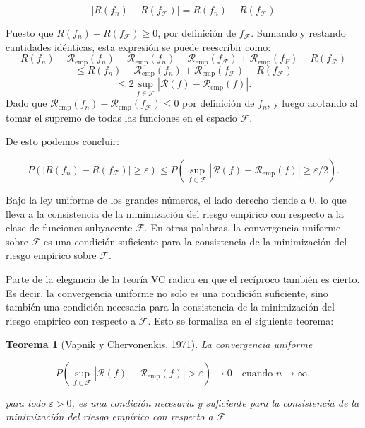\documentclass{report}
\newtheorem{thm}{Teorema}[section]
\begin{document}
\[
|R(f_n) - R(f_\mathcal{F})| = R(f_n) - R(f_\mathcal{F})
\]

Puesto que  \(R(f_n) - R(f_\mathcal{F}) \geq 0\), por definición de \(f_\mathcal{F}\). Sumando y restando cantidades idénticas,
esta expresión se puede reescribir como:
\[
R(f_n) - \mathcal{R}_{\text{emp}}(f_n) + \mathcal{R}_{\text{emp}}(f_n) - \mathcal{R}_{\text{emp}}(f_\mathcal{F}) + \mathcal{R}_{\text{emp}}(f_F) - R(f_\mathcal{F})
\]
\[
    \leq R(f_n) - \mathcal{R}_{\text{emp}}(f_n) + \mathcal{R}_{\text{emp}}(f_\mathcal{F}) - R(f_\mathcal{F})
\]
\[
    \leq 2 \sup_{f \in \mathcal{F}} |\mathcal{R}(f) - \mathcal{R}_{\text{emp}}(f)|.
\]
Dado que \(\mathcal{R}_{\text{emp}}(f_n) - \mathcal{R}_{\text{emp}}(f_\mathcal{F}) \leq 0\) por definición de \(f_n\), y luego acotando
al tomar el supremo de todas las funciones en el espacio \(\mathcal{F}\).

De esto podemos concluir:

\[
P\left(|R(f_n) - R(f_\mathcal{F})| \geq \varepsilon \right) \leq P\left(\sup_{f \in \mathcal{F}} |\mathcal{R}(f) - \mathcal{R}_{\text{emp}}(f)| \geq \varepsilon/2\right).
\]

Bajo la ley uniforme de los grandes números, el lado derecho tiende a \(0\), lo que lleva a la consistencia de
la minimización del riesgo empírico con respecto a la clase de funciones subyacente \(\mathcal{F}\). En otras palabras,
la convergencia uniforme sobre \(\mathcal{F}\) es una condición suficiente para la consistencia de la minimización del
riesgo empírico sobre \(\mathcal{F}\).

Parte de la elegancia de la teoría VC radica en que el recíproco también es cierto. Es decir,
la convergencia uniforme no solo es una condición suficiente, sino también una condición necesaria para la
consistencia de la minimización del riesgo empírico con respecto a \(\mathcal{F}\). Esto se formaliza en el siguiente
teorema:

\begin{thm}[Vapnik y Chervonenkis, 1971]
La convergencia uniforme

    \[
        P\left(\sup_{f \in \mathcal{F}} |\mathcal{R}(f) - \mathcal{R}_{\text{emp}}(f)| > \varepsilon \right) \to 0 \quad \text{cuando } n \to \infty,
        \]

        para todo \(\varepsilon > 0\), es una condición necesaria y suficiente para la consistencia de la minimización del
        riesgo empírico con respecto a \(\mathcal{F}\).
\end{thm}
\end{document}
